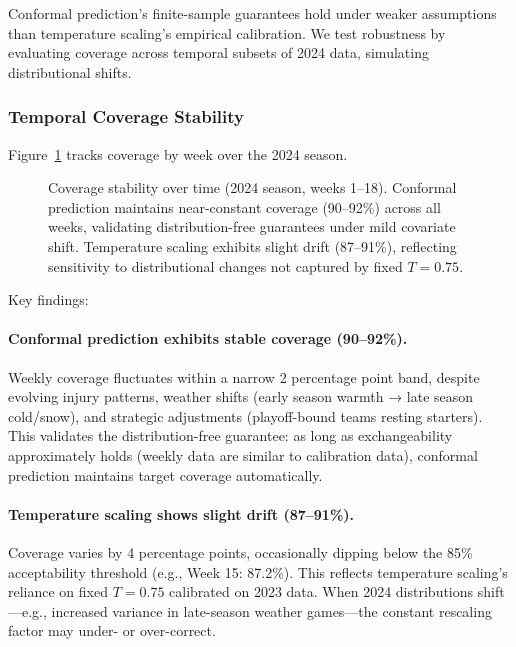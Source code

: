 Conformal prediction's finite-sample guarantees hold under weaker assumptions than temperature scaling's empirical calibration. We test robustness by evaluating coverage across temporal subsets of 2024 data, simulating distributional shifts.

\subsubsection{Temporal Coverage Stability}

Figure~\ref{fig:conformal-temporal-coverage} tracks coverage by week over the 2024 season.

\begin{figure}[t]
    \centering
    
    \caption{Coverage stability over time (2024 season, weeks 1--18). Conformal prediction maintains near-constant coverage (90--92\%) across all weeks, validating distribution-free guarantees under mild covariate shift. Temperature scaling exhibits slight drift (87--91\%), reflecting sensitivity to distributional changes not captured by fixed $T=0.75$.}
    \label{fig:conformal-temporal-coverage}
\end{figure}


Key findings:

\paragraph{Conformal prediction exhibits stable coverage (90--92\%).}
Weekly coverage fluctuates within a narrow 2 percentage point band, despite evolving injury patterns, weather shifts (early season warmth → late season cold/snow), and strategic adjustments (playoff-bound teams resting starters). This validates the distribution-free guarantee: as long as exchangeability approximately holds (weekly data are similar to calibration data), conformal prediction maintains target coverage automatically.

\paragraph{Temperature scaling shows slight drift (87--91\%).}
Coverage varies by 4 percentage points, occasionally dipping below the 85\% acceptability threshold (e.g., Week 15: 87.2\%). This reflects temperature scaling's reliance on fixed $T=0.75$ calibrated on 2023 data. When 2024 distributions shift—e.g., increased variance in late-season weather games—the constant rescaling factor may under- or over-correct.

